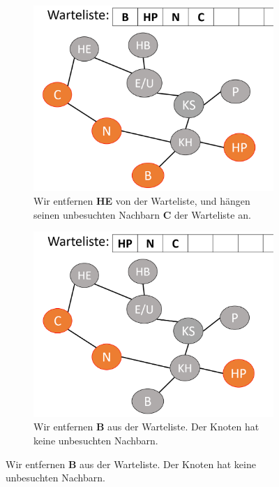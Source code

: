 \begin{figure}[H]
\begin{subfigure}[h]{0.45\textwidth}
    \end{subfigure}
    \vspace{5mm}
    \begin{subfigure}[h]{0.45\textwidth}
    \centering
    \includegraphics[width=\textwidth]{Pictures/BS/BFSB6.PNG}
    \caption{Wir entfernen {\bf{HE}} von der Warteliste, und hängen seinen unbesuchten Nachbarn {\bf{C}} der Warteliste an.}
    \end{subfigure}
    \qquad
    \begin{subfigure}[h]{0.45\textwidth}
    \centering
    \includegraphics[width=\textwidth]{Pictures/BS/BFSB7.PNG}
    \caption{Wir entfernen {\bf{B}} aus der Warteliste. Der Knoten hat keine unbesuchten Nachbarn.}
    \end{subfigure}
\end{figure}

